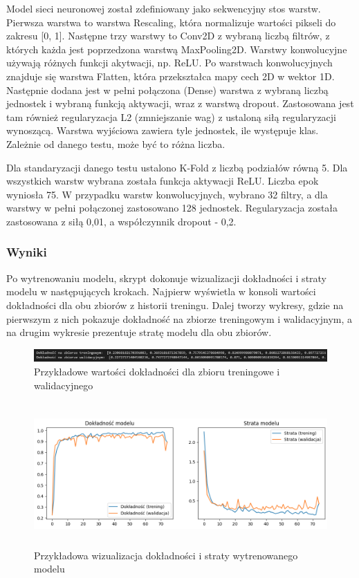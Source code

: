 Model sieci neuronowej został zdefiniowany jako sekwencyjny stos warstw.
Pierwsza warstwa to warstwa Rescaling, która normalizuje wartości pikseli do zakresu [0, 1].
Następne trzy warstwy to Conv2D z wybraną liczbą filtrów, z których każda jest poprzedzona warstwą MaxPooling2D.
Warstwy konwolucyjne używają różnych funkcji akytwacji, np. ReLU.
Po warstwach konwolucyjnych znajduje się warstwa Flatten, która przekształca mapy cech 2D w wektor 1D.
Następnie dodana jest w pełni połączona (Dense) warstwa z wybraną liczbą jednostek
i wybraną funkcją aktywacji, wraz z warstwą dropout.
Zastosowana jest tam również regularyzacja L2 (zmniejszanie wag) z ustaloną siłą regularyzacji wynoszącą.
Warstwa wyjściowa zawiera tyle jednostek, ile występuje klas.
Zależnie od danego testu, może być to różna liczba.

Dla standaryzacji danego testu ustalono K-Fold z liczbą podziałów równą 5.
Dla wszystkich warstw wybrana została funkcja aktywacji ReLU.
Liczba epok wyniosła 75.
W przypadku warstw konwolucyjnych, wybrano 32 filtry, a dla warstwy w pełni połączonej zastosowano 128 jednostek.
Regularyzacja została zastosowana z siłą 0,01, a współczynnik dropout - 0,2.

\subsubsection{Wyniki}
Po wytrenowaniu modelu, skrypt dokonuje wizualizacji dokładności i straty modelu w następujących krokach.
Najpierw wyświetla w konsoli wartości dokładności dla obu zbiorów z historii treningu.
Dalej tworzy wykresy, gdzie na pierwszym z nich pokazuje dokładność na zbiorze treningowym i walidacyjnym,
a na drugim wykresie prezentuje stratę modelu dla obu zbiorów.

\begin{figure}[ht]
	\centering
	\includegraphics[width=15cm]{partials/images/test-standard-result.png}
	\caption{Przykładowe wartości dokładności dla zbioru treningowe i walidacyjnego}
	\label{Fig:tests-wyniki-2}
\end{figure}
\FloatBarrier

\begin{figure}[ht]
	\centering
	\includegraphics[height=5.5cm]{partials/images/tests/v2_epoch75.png}
	\caption{Przykładowa wizualizacja dokładności i straty wytrenowanego modelu}
	\label{Fig:tests-wyniki-1}
\end{figure}
\FloatBarrier

